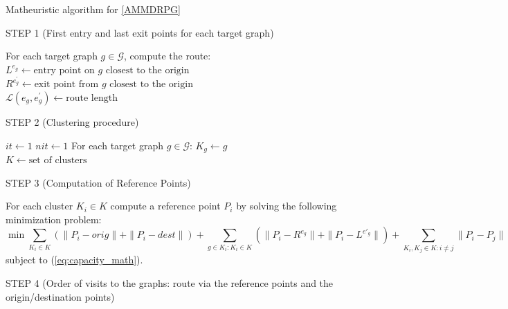 \begin{algorithm}
\caption{Matheuristic algorithm for \ref{AMMDRPG}}\label{alg:math}

STEP 1 (First entry and last exit points for each target graph)\\
\begin{algorithmic}
\State For each target graph $g \in \mathcal{G}$, compute the route:\\
 $ L^{e_{g}} \gets \mbox{entry point on $g$ closest to the origin}$\\
 $R^{e^{'}_{g}} \gets \mbox{exit point from $g$ closest to the origin}$\\
 $\mathcal L(e_{g}, e^{'}_{g}) \gets \mbox{route length}$
\end{algorithmic}
STEP 2 (Clustering procedure)
\begin{algorithmic}
\State $it \gets 1$
\State $nit \gets 1$
\State For each target graph $g \in \mathcal{G}$:\;
$K_g \gets g$ \\
$K \gets \mbox{set of clusters}$
\end{algorithmic}
STEP 3 (Computation of Reference Points) 
\begin{algorithmic}
\State For each cluster $K_i \in K$\;
compute a reference point $P_i$ by solving the following minimization problem:
$$
\min \sum_{K_i \in K}( \|P_i - orig\| + \|P_i - dest \|) + \sum_{g \in K_i: K_i \in K} (\|P_i - R^{e_g} \| + \| P_i - L^{e'_g}\|) + \sum_{K_i, K_j \in K: i \neq j} \|P_i - P_j\|
$$
subject to (\ref{eq:capacity_math}).
\end{algorithmic}
STEP 4 (Order of visits to the graphs: route via the reference points and the origin/destination points)

\end{algorithm}
